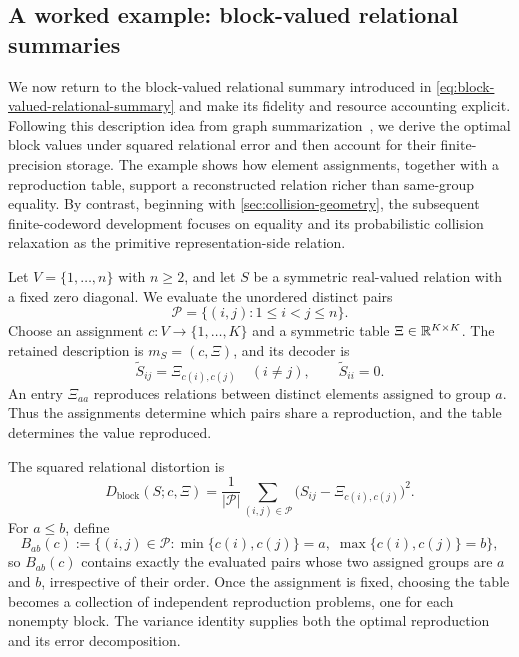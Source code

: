 \subsection{A worked example: block-valued relational summaries}
\label{sec:block-summary-walkthrough}

We now return to the block-valued relational summary introduced in \cref{eq:block-valued-relational-summary} and make its fidelity and resource accounting explicit.
Following this description idea from graph summarization~\citep{riondato2017graph}, we derive the optimal block values under squared relational error and then account for their finite-precision storage.
The example shows how element assignments, together with a reproduction table, support a reconstructed relation richer than same-group equality.
By contrast, beginning with \cref{sec:collision-geometry}, the subsequent finite-codeword development focuses on equality and its probabilistic collision relaxation as the primitive representation-side relation.

Let $V=\{1,\ldots,n\}$ with $n\ge2$, and let $S$ be a symmetric real-valued relation with a fixed zero diagonal.
We evaluate the unordered distinct pairs
\begin{equation}
\mathcal P=\{(i,j):1\le i<j\le n\}.
\end{equation}
Choose an assignment $c:V\to\{1,\ldots,K\}$ and a symmetric table $\Xi\in\mathbb{R}^{K\times K}$.
The retained description is $m_S=(c,\Xi)$, and its decoder is
\begin{equation}
\widetilde S_{ij}=\Xi_{c(i),c(j)}\quad(i\ne j),
\qquad
\widetilde S_{ii}=0.
\label{eq:block-summary-decoder}
\end{equation}
An entry $\Xi_{aa}$ reproduces relations between distinct elements assigned to group $a$.
Thus the assignments determine which pairs share a reproduction, and the table determines the value reproduced.

The squared relational distortion is
\begin{equation}
D_{\mathrm{block}}(S;c,\Xi)
=\frac{1}{|\mathcal P|}
\sum_{(i,j)\in\mathcal P}
\bigl(S_{ij}-\Xi_{c(i),c(j)}\bigr)^2.
\label{eq:block-summary-distortion}
\end{equation}
For $a\le b$, define
\[
B_{ab}(c)
:=
\{(i,j)\in\mathcal P:
\min\{c(i),c(j)\}=a,\;
\max\{c(i),c(j)\}=b\},
\]
so $B_{ab}(c)$ contains exactly the evaluated pairs whose two assigned groups are $a$ and $b$, irrespective of their order.
Once the assignment is fixed, choosing the table becomes a collection of independent reproduction problems, one for each nonempty block.
The variance identity supplies both the optimal reproduction and its error decomposition.

